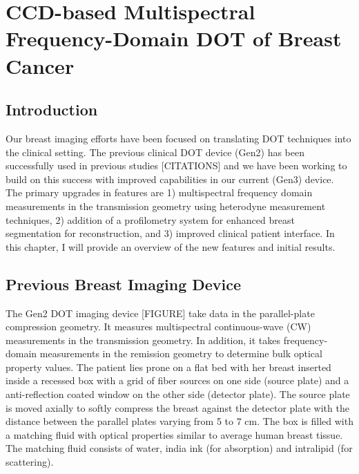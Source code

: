 \chapter{CCD-based Multispectral Frequency-Domain DOT of Breast Cancer}

\section{Introduction}
Our breast imaging efforts have been focused on translating DOT techniques into the clinical setting. The previous clinical DOT device (Gen2)  has been successfully used in previous studies [CITATIONS] and we have been working to build on this success with improved capabilities in our current (Gen3) device. The primary upgrades in features are 1) multispectral frequency domain measurements in the transmission geometry using heterodyne measurement techniques, 2) addition of a profilometry system for enhanced breast segmentation for reconstruction, and 3) improved clinical patient interface. In this chapter, I will provide an overview of the new features and initial results.

\section{Previous Breast Imaging Device}
The Gen2 DOT imaging device [FIGURE] take data in the parallel-plate compression geometry. It measures multispectral continuous-wave (CW) measurements in the transmission geometry. In addition, it takes frequency-domain measurements in the remission geometry to determine bulk optical property values. The patient lies prone on a flat bed with her breast inserted inside a recessed box with a grid of fiber sources on one side (source plate) and a anti-reflection coated window on the other side (detector plate). The source plate is moved axially to softly compress the breast against the detector plate with the distance between the parallel plates varying from 5 to 7 cm. The box is filled with a matching fluid with optical properties similar to average human breast tissue. The matching fluid consists of water, india ink (for absorption) and intralipid (for scattering).

